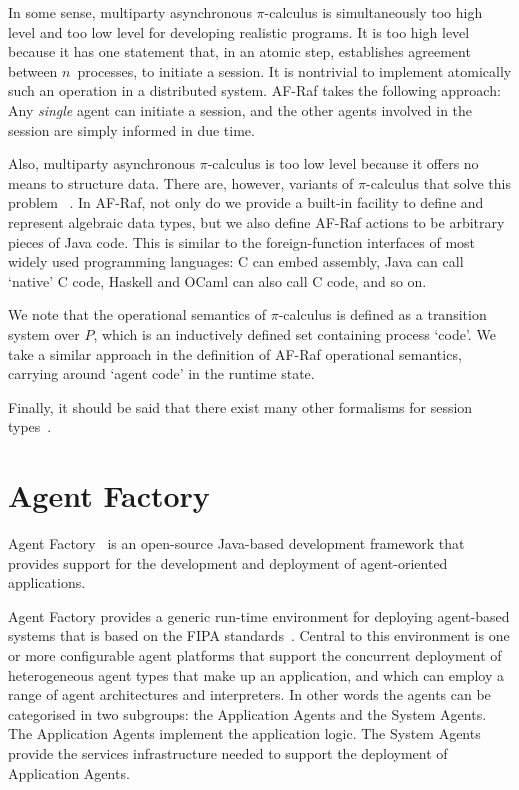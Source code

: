 \documentclass[a4paper,12pt,oneside,fleqn]{book} %
\begin{document}
In some sense,
  multiparty asynchronous $\pi$-calculus is simultaneously
    too high level and too low level for developing realistic programs.
It is too high level
  because it has one statement that, in an atomic step,
    establishes agreement between $n$~processes, to initiate a session.
It is nontrivial to implement atomically such an operation
  in a distributed system.
AF-Raf takes the following approach:
Any \emph{single} agent can initiate a session,
  and the other agents involved in the session are simply informed in due time.

Also, multiparty asynchronous $\pi$-calculus is too low level
  because it offers no means to structure data.
There are, however, variants of $\pi$-calculus that solve this problem~%
  \cite{DBLP:conf/popl/AbadiF01}.
In AF-Raf,
  not only do we provide a built-in facility to define and represent
  algebraic data types,
  but we also define AF-Raf actions to be arbitrary pieces of Java code.
This is similar to the foreign-function interfaces of most widely used
programming languages:
  C can embed assembly,
  Java can call `native' C code,
  Haskell and OCaml can also call C code,
  and so on.

We note that the operational semantics of $\pi$-calculus
  is defined as a transition system over $P$,
  which is an inductively defined set containing process `code'.
We take a similar approach in the definition of AF-Raf operational
semantics, carrying around `agent code' in the runtime state.

Finally,
  it should be said that there exist many other formalisms for session
  types~\cite{DBLP:conf/forte/CastagnaDP11}.


\chapter{Agent Factory} %

Agent Factory~\cite{collier2002agent} \cite{russell2011af} is an
open-source Java-based development framework that provides support for the
development and deployment of agent-oriented applications.

Agent Factory provides a generic run-time environment for deploying
agent-based systems that is based on the FIPA
standards~\cite{poslad2000fipa}.  Central to this environment is one or
more configurable agent platforms that support the concurrent deployment of
heterogeneous agent types that make up an application, and which can employ
a range of agent architectures and interpreters. In other words the agents
can be categorised in two subgroups: the Application Agents and the System
Agents. The Application Agents implement the application logic. The System
Agents provide the services infrastructure needed to support the deployment
of Application Agents.
\end{document}
